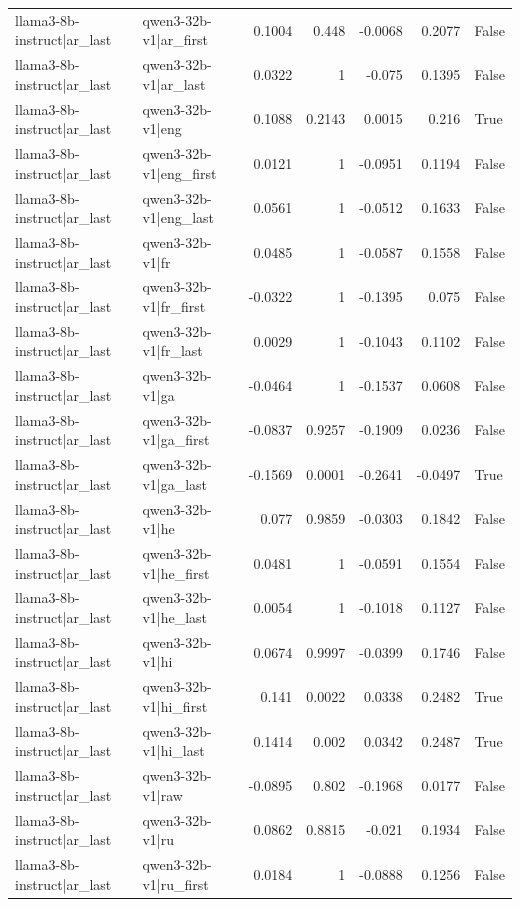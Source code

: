\begin{table}
\begin{tabular}{l l r r r r l}
llama3-8b-instruct|ar_last & qwen3-32b-v1|ar_first & 0.1004 & 0.448 & -0.0068 & 0.2077 & False \\
llama3-8b-instruct|ar_last & qwen3-32b-v1|ar_last & 0.0322 & 1 & -0.075 & 0.1395 & False \\
llama3-8b-instruct|ar_last & qwen3-32b-v1|eng & 0.1088 & 0.2143 & 0.0015 & 0.216 & True \\
llama3-8b-instruct|ar_last & qwen3-32b-v1|eng_first & 0.0121 & 1 & -0.0951 & 0.1194 & False \\
llama3-8b-instruct|ar_last & qwen3-32b-v1|eng_last & 0.0561 & 1 & -0.0512 & 0.1633 & False \\
llama3-8b-instruct|ar_last & qwen3-32b-v1|fr & 0.0485 & 1 & -0.0587 & 0.1558 & False \\
llama3-8b-instruct|ar_last & qwen3-32b-v1|fr_first & -0.0322 & 1 & -0.1395 & 0.075 & False \\
llama3-8b-instruct|ar_last & qwen3-32b-v1|fr_last & 0.0029 & 1 & -0.1043 & 0.1102 & False \\
llama3-8b-instruct|ar_last & qwen3-32b-v1|ga & -0.0464 & 1 & -0.1537 & 0.0608 & False \\
llama3-8b-instruct|ar_last & qwen3-32b-v1|ga_first & -0.0837 & 0.9257 & -0.1909 & 0.0236 & False \\
llama3-8b-instruct|ar_last & qwen3-32b-v1|ga_last & -0.1569 & 0.0001 & -0.2641 & -0.0497 & True \\
llama3-8b-instruct|ar_last & qwen3-32b-v1|he & 0.077 & 0.9859 & -0.0303 & 0.1842 & False \\
llama3-8b-instruct|ar_last & qwen3-32b-v1|he_first & 0.0481 & 1 & -0.0591 & 0.1554 & False \\
llama3-8b-instruct|ar_last & qwen3-32b-v1|he_last & 0.0054 & 1 & -0.1018 & 0.1127 & False \\
llama3-8b-instruct|ar_last & qwen3-32b-v1|hi & 0.0674 & 0.9997 & -0.0399 & 0.1746 & False \\
llama3-8b-instruct|ar_last & qwen3-32b-v1|hi_first & 0.141 & 0.0022 & 0.0338 & 0.2482 & True \\
llama3-8b-instruct|ar_last & qwen3-32b-v1|hi_last & 0.1414 & 0.002 & 0.0342 & 0.2487 & True \\
llama3-8b-instruct|ar_last & qwen3-32b-v1|raw & -0.0895 & 0.802 & -0.1968 & 0.0177 & False \\
llama3-8b-instruct|ar_last & qwen3-32b-v1|ru & 0.0862 & 0.8815 & -0.021 & 0.1934 & False \\
llama3-8b-instruct|ar_last & qwen3-32b-v1|ru_first & 0.0184 & 1 & -0.0888 & 0.1256 & False \\

\end{tabular}
\end{table}
